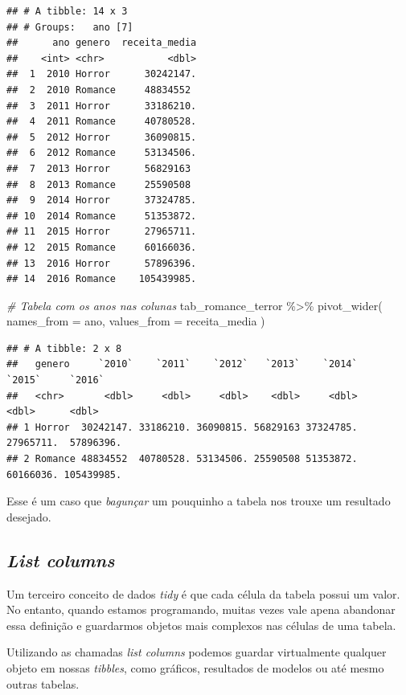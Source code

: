 \documentclass[
]{book}
\newenvironment{Shaded}{\begin{snugshade}}{\end{snugshade}}
\newcommand{\AttributeTok}[1]{\textcolor[rgb]{0.77,0.63,0.00}{#1}}
\newcommand{\CommentTok}[1]{\textcolor[rgb]{0.56,0.35,0.01}{\textit{#1}}}
\newcommand{\FunctionTok}[1]{\textcolor[rgb]{0.00,0.00,0.00}{#1}}
\newcommand{\NormalTok}[1]{#1}
\newcommand{\SpecialCharTok}[1]{\textcolor[rgb]{0.00,0.00,0.00}{#1}}
\begin{document}
\begin{verbatim}
## # A tibble: 14 x 3
## # Groups:   ano [7]
##      ano genero  receita_media
##    <int> <chr>           <dbl>
##  1  2010 Horror      30242147.
##  2  2010 Romance     48834552 
##  3  2011 Horror      33186210.
##  4  2011 Romance     40780528.
##  5  2012 Horror      36090815.
##  6  2012 Romance     53134506.
##  7  2013 Horror      56829163 
##  8  2013 Romance     25590508 
##  9  2014 Horror      37324785.
## 10  2014 Romance     51353872.
## 11  2015 Horror      27965711.
## 12  2015 Romance     60166036.
## 13  2016 Horror      57896396.
## 14  2016 Romance    105439985.
\end{verbatim}

\begin{Shaded}
\begin{Highlighting}[]
\CommentTok{\# Tabela com os anos nas colunas}
\NormalTok{tab\_romance\_terror }\SpecialCharTok{\%\textgreater{}\%} 
  \FunctionTok{pivot\_wider}\NormalTok{(}
    \AttributeTok{names\_from =}\NormalTok{ ano,}
    \AttributeTok{values\_from =}\NormalTok{ receita\_media}
\NormalTok{  )}
\end{Highlighting}
\end{Shaded}

\begin{verbatim}
## # A tibble: 2 x 8
##   genero     `2010`    `2011`    `2012`   `2013`    `2014`    `2015`     `2016`
##   <chr>       <dbl>     <dbl>     <dbl>    <dbl>     <dbl>     <dbl>      <dbl>
## 1 Horror  30242147. 33186210. 36090815. 56829163 37324785. 27965711.  57896396.
## 2 Romance 48834552  40780528. 53134506. 25590508 51353872. 60166036. 105439985.
\end{verbatim}

Esse é um caso que \emph{bagunçar} um pouquinho a tabela nos trouxe um resultado desejado.

\hypertarget{list-columns}{%
\subsection{\texorpdfstring{\emph{List columns}}{List columns}}\label{list-columns}}

Um terceiro conceito de dados \emph{tidy} é que cada célula da tabela possui um valor. No entanto, quando estamos programando, muitas vezes vale apena abandonar essa definição e guardarmos objetos mais complexos nas células de uma tabela.

Utilizando as chamadas \emph{list columns} podemos guardar virtualmente qualquer objeto em nossas \emph{tibbles}, como gráficos, resultados de modelos ou até mesmo outras tabelas.
\end{document}
